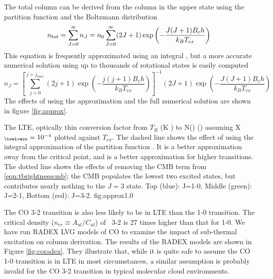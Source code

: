 The total column can be derived from the column in the upper state using the partition
function and the Boltzmann distribution
\begin{equation}
  n_{tot}  =        \sum_{J=0}^\infty n_J = n_0 \sum_{J=0}^\infty  (2J+1) \exp\left(-\frac{J(J+1) B_e h}{k_B T_{ex}}\right) \label{eqn:approxpartition}\\
\end{equation}
This equation is frequently approximated using an integral
\citep[e.g.][]{Cabrit1990}, but a more accurate numerical solution using up to
thousands of rotational states is easily computed
\begin{equation}
  n_J = \left[ \sum_{j=0}^{j=j_{max}} (2j+1) \exp\left(-\frac{j(j+1) B_e h}{k_B T_{ex}}\right) \right]^{-1} (2J+1) \exp\left(-\frac{J(J+1) B_e h}{k_B T_{ex}}\right)
\end{equation}
The effects of using the approximation and the full numerical solution are shown in figure \ref{fig:approx}.


{The LTE, optically thin conversion factor from $T_B$ (K \kms) to N(\hh)
(\persc) assuming X$_{\twelveco}=10^{-4}$ plotted against $T_{ex}$.  The
dashed line shows the effect of using the integral approximation of the 
partition function \citep[e.g.][]{Cabrit1990}.  It is a better
approximation away from the critical point, and is a better approximation
for higher transitions.  The dotted line shows the effects of removing the 
CMB term from \eqref{eqn:tbrightnesscmb}; the CMB populates the lowest two
excited states, but contributes nearly nothing to the $J=3$ state. Top (blue):
J=1-0, Middle (green): J=2-1, Bottom (red): J=3-2.}
{fig:approx}{1.0}


The CO 3-2 transition is also less likely to be in LTE than the 1-0 transition.
The critical density ($n_{cr}\equiv A_{ul}/C_{ul}$) of \twelveco\ 3-2 is 27
times higher than that for 1-0.  We have run RADEX \citep{VanDerTak2007} LVG
models of CO to examine the impact of sub-thermal excitation on column
derivation.  The results of the RADEX models are shown in Figure
\ref{fig:coradex}.  They illustrate that, while it is quite safe to assume the
CO 1-0 transition is in LTE in most circumstances, a similar assumption is
probably invalid for the CO 3-2 transition in typical molecular cloud
environments.


